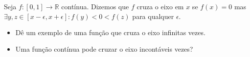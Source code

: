 Seja \(f\colon  [0,1]\to \mathbb{R}\) contínua. Dizemos que \(f\) cruza o eixo em \(x\) se \(f(x)=0\) mas \(\exists y,z \in [x-\epsilon,x+\epsilon]: f(y)<0<f(z)\) para qualquer \(\epsilon\).
\begin{itemize}

\item[(a)] Dê um exemplo de uma função que cruza o eixo infinitas vezes.

\item[(b)] Uma função contínua pode cruzar o eixo incontáveis vezes?
\end{itemize}
